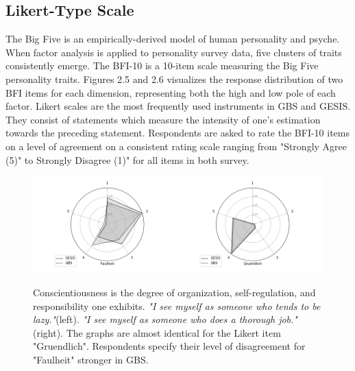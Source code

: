 \subsection{Likert-Type Scale}

The Big Five is an empirically-derived model of human personality and psyche. When factor analysis is applied to personality survey data, five clusters of traits consistently emerge. The BFI-10 is a 10-item scale measuring the Big Five personality traits. Figures 2.5 and 2.6 visualizes the response distribution of two BFI items for each dimension, representing both the high and low pole of each factor. Likert scales are the most frequently used instruments in GBS and GESIS. They consist of statements which measure the intensity of one's estimation towards the preceding statement. Respondents are asked to rate the BFI-10 items on a level of agreement on a consistent rating scale ranging from "Strongly Agree (5)" to Strongly Disagree (1)" for all items in both survey. 

\begin{figure}[H]
	\begin{center}
		\includegraphics[scale=0.52,angle=0]{fig/Conscientiousness_figure}
		\label{Conscientiousness}
		\caption{Conscientiousness is the degree of organization, self-regulation, and responsibility one exhibits. \textit{"I see myself as someone who tends to be lazy."}(left). \textit{"I see myself as someone who does a thorough job."}(right). The graphs are almost identical for the Likert item "Gruendlich". Respondents specify their level of disagreement for "Faulheit" stronger in GBS.}
	\end{center}
\end{figure}

